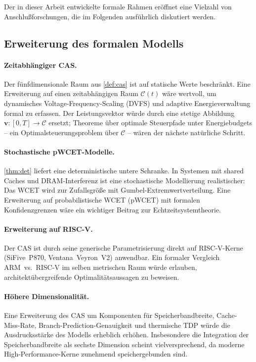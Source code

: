 ﻿\documentclass[a4paper,12pt]{article}
\theoremstyle{plain}
\theoremstyle{definition}
\theoremstyle{remark}
\begin{document}
Der in dieser Arbeit entwickelte formale Rahmen er\"offnet eine Vielzahl von
Anschlu\ss{}forschungen, die im Folgenden ausf\"uhrlich diskutiert werden.

\subsection{Erweiterung des formalen Modells}

\paragraph{Zeitabh\"angiger CAS.}
Der f\"unfdimensionale Raum aus \cref{def:cas} ist auf statische Werte beschr\"ankt.
Eine Erweiterung auf einen zeitabh\"angigen Raum $\mathcal{C}(t)$ w\"are wertvoll,
um dynamisches Voltage-Frequency-Scaling (DVFS) und adaptive Energieverwaltung
formal zu erfassen. Der Leistungsvektor w\"urde durch eine stetige Abbildung
$\mathbf{v}:[0,T]\to\mathcal{C}$ ersetzt; Theoreme \"uber optimale Steuerpfade unter
Energiebudgets -- ein Optimalsteuerungsproblem \"uber $\mathcal{C}$ -- w\"aren
der n\"achste nat\"urliche Schritt.

\paragraph{Stochastische pWCET-Modelle.}
\cref{thm:det} liefert eine deterministische untere Schranke. In Systemen mit
shared Caches und DRAM-Interferenz ist eine stochastische Modellierung realistischer:
Das WCET wird zur Zufallsgr\"o\ss{}e mit Gumbel-Extremwertverteilung. Eine
Erweiterung auf probabilistische WCET (pWCET) mit formalen Konfidenzgrenzen
w\"are ein wichtiger Beitrag zur Echtzeitsystemtheorie.

\paragraph{Erweiterung auf RISC-V.}
Der CAS ist durch seine generische Parametrisierung direkt auf RISC-V-Kerne
(SiFive~P870, Ventana~Veyron~V2) anwendbar. Ein formaler Vergleich
ARM~vs.\ RISC-V im selben metrischen Raum w\"urde erlauben, architekt\"ubergreifende
Optimalit\"atsaussagen zu beweisen.

\paragraph{H\"ohere Dimensionalit\"at.}
Eine Erweiterung des CAS um Komponenten f\"ur Speicherbandbreite, Cache-Miss-Rate,
Branch-Prediction-Genauigkeit und thermische TDP w\"urde die Ausdrucksst\"arke
des Modells erheblich erh\"ohen. Insbesondere die Integration der Speicherbandbreite
als sechste Dimension scheint vielversprechend, da moderne High-Performance-Kerne
zunehmend speichergebunden sind.
\end{document}
